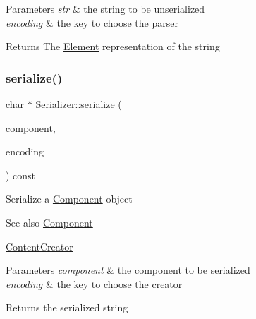 \begin{DoxyParams}{Parameters}
{\em str} & the string to be unserialized \\
\hline
{\em encoding} & the key to choose the parser \\
\hline
\end{DoxyParams}
\begin{DoxyReturn}{Returns}
The \mbox{\hyperlink{classElement}{Element}} representation of the string 
\end{DoxyReturn}
\mbox{\label{classSerializer_a5cfe31eb70f4d0c92f2d68c22f39e885}} 
\subsubsection{\texorpdfstring{serialize()}{serialize()}\hspace{0.1cm}{\footnotesize\ttfamily [1/2]}}
{\footnotesize\ttfamily char $\ast$ Serializer\+::serialize (\begin{DoxyParamCaption}\item[{const \mbox{\hyperlink{classComponent}{Component}} $\ast$}]{component,  }\item[{const char $\ast$}]{encoding }\end{DoxyParamCaption}) const\hspace{0.3cm}{\ttfamily [virtual]}}

Serialize a \mbox{\hyperlink{classComponent}{Component}} object \begin{DoxySeeAlso}{See also}
\mbox{\hyperlink{classComponent}{Component}} 

\mbox{\hyperlink{classContentCreator}{Content\+Creator}}
\end{DoxySeeAlso}

\begin{DoxyParams}{Parameters}
{\em component} & the component to be serialized \\
\hline
{\em encoding} & the key to choose the creator \\
\hline
\end{DoxyParams}
\begin{DoxyReturn}{Returns}
the serialized string 
\end{DoxyReturn}
\mbox{\label{classSerializer_a38bec517fb3b3cc0778c75b807cb930c}} 
